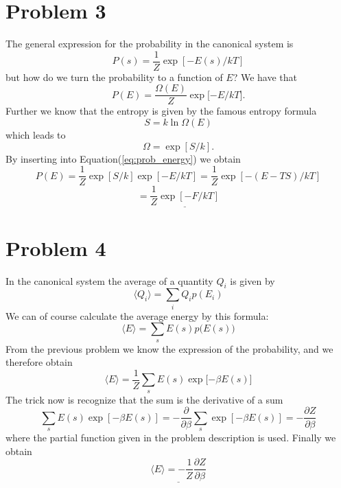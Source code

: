 \documentclass[norsk,a4paper,12pt]{article}
\begin{document}
\section*{Problem 3}
The general expression for the probability in the canonical system is
\begin{equation}
P(s)=\frac{1}{Z}\exp{[-E(s)/kT]}
\end{equation}
but how do we turn the probability to a function of $E$? We have that
\begin{equation}
P(E)=\frac{\Omega(E)}{Z}\exp{[-E/kT}].
\label{eq:prob_energy}
\end{equation}
Further we know that the entropy is given by the famous entropy formula
\begin{equation}
S=k\ln\Omega(E)
\end{equation}
which leads to
\begin{equation}
\Omega=\exp{[S/k]}.
\end{equation}
By inserting into Equation(\ref{eq:prob_energy}) we obtain
\begin{equation*}
P(E)=\frac{1}{Z}\exp{[S/k]}\exp{[-E/kT]}=\frac{1}{Z}\exp{[-(E-TS)/kT]}
\end{equation*}
\begin{equation}
=\underline{\frac{1}{Z}\exp{[-F/kT]}}
\end{equation}


\section*{Problem 4}
In the canonical system the average of a quantity $Q_i$ is given by
\begin{equation}
\langle Q_i \rangle = \sum_iQ_ip(E_i)
\end{equation}
We can of course calculate the average energy by this formula:
$$\langle E\rangle = \sum_sE(s)p\big(E(s)\big)$$
From the previous problem we know the expression of the probability, and we therefore obtain
$$\langle E \rangle = \frac{1}{Z}\sum_s E(s) \exp\big[{-\beta E(s)}\big]$$
The trick now is recognize that the sum is the derivative of a sum
\begin{equation}
\sum_sE(s)\exp{[-\beta E(s)]}=-\frac{\partial}{\partial \beta}\sum_s\exp{[-\beta E(s)]}=-\frac{\partial Z}{\partial \beta}
\end{equation}
where the partial function given in the problem description is used. Finally we obtain
\begin{equation}
\underline{\langle E\rangle=-\frac{1}{Z}\frac{\partial Z}{\partial\beta}}
\end{equation}
\end{document}
